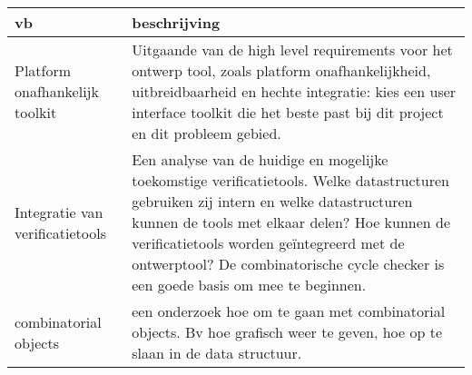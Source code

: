 \begin{center}
    \begin{tabular}{|p{13em}|p{22em}|}
    \hline
        {\bf vb}		& {\bf beschrijving} \\\hline

Platform onafhankelijk toolkit &
Uitgaande van de high level requirements voor het ontwerp tool, zoals platform
onafhankelijkheid, uitbreidbaarheid en hechte integratie: kies een user interface
toolkit die het beste past bij dit project en dit probleem gebied.\\\hline

Integratie van verificatietools &
Een analyse van de huidige en mogelijke toekomstige verificatietools. Welke
datastructuren gebruiken zij intern en welke datastructuren kunnen de tools
met elkaar delen? Hoe kunnen de verificatietools worden ge\"integreerd met
de ontwerptool? De combinatorische cycle checker is een goede basis om mee
te beginnen.\\\hline

combinatorial objects &
een onderzoek hoe om te gaan met combinatorial objects. Bv hoe grafisch weer
te geven, hoe op te slaan in de data structuur.\\\hline

    \end{tabular}
\end{center}


